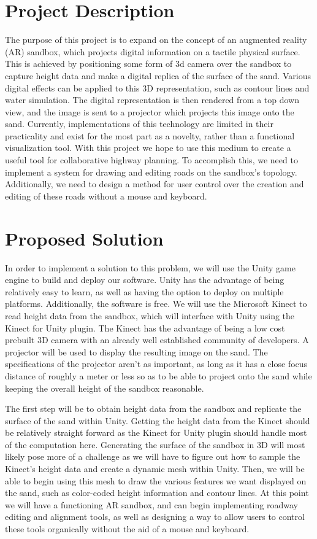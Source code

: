 \documentclass[onecolumn, draftclsnofoot,10pt, compsoc]{IEEEtran}
\begin{document}
\section{Project Description}
The purpose of this project is to expand on the concept of an augmented reality (AR) sandbox, which projects digital information on a tactile physical surface.
This is achieved by positioning some form of 3d camera over the sandbox to capture height data and make a digital replica of the surface of the sand.
Various digital effects can be applied to this 3D representation, such as contour lines and water simulation.
The digital representation is then rendered from a top down view, and the image is sent to a projector which projects this image onto the sand.
Currently, implementations of this technology are limited in their practicality and exist for the most part as a novelty, rather than a functional visualization tool.
With this project we hope to use this medium to create a useful tool for collaborative highway planning. 
To accomplish this, we need to implement a system for drawing and editing roads on the sandbox's topology. 
Additionally, we need to design a method for user control over the creation and editing of these roads without a mouse and keyboard.

\section{Proposed Solution}
In order to implement a solution to this problem, we will use the Unity game engine to build and deploy our software.
Unity has the advantage of being relatively easy to learn, as well as having the option to deploy on multiple platforms.
Additionally, the software is free.
We will use the Microsoft Kinect to read height data from the sandbox, which will interface with Unity using the Kinect for Unity plugin.
The Kinect has the advantage of being a low cost prebuilt 3D camera with an already well established community of developers.
A projector will be used to display the resulting image on the sand.
The specifications of the projector aren't as important, as long as it has a close focus distance of roughly a meter or less so as to be able to project onto the sand while keeping the overall height of the sandbox reasonable.

The first step will be to obtain height data from the sandbox and replicate the surface of the sand within Unity.
Getting the height data from the Kinect should be relatively straight forward as the Kinect for Unity plugin should handle most of the computation here.
Generating the surface of the sandbox in 3D will most likely pose more of a challenge as we will have to figure out how to sample the Kinect's height data and create a dynamic mesh within Unity.
Then, we will be able to begin using this mesh to draw the various features we want displayed on the sand, such as color-coded height information and contour lines.
At this point we will have a functioning AR sandbox, and can begin implementing roadway editing and alignment tools, as well as designing a way to allow users to control these tools organically without the aid of a mouse and keyboard.
\end{document}
